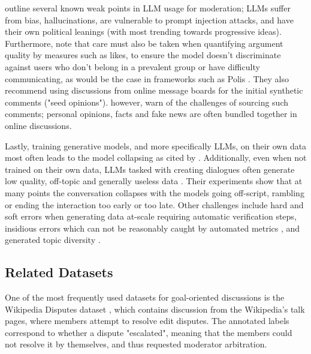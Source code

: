 \citet{small-polis-llm} outline several known weak points in LLM usage for moderation; LLMs suffer from bias, hallucinations, are vulnerable to prompt injection attacks, and have their own political leanings (with most trending towards progressive ideas). Furthermore, \citet{vecchi-2021-towards} note that care must also be taken when quantifying argument quality by measures such as likes, to ensure the model doesn't discriminate against users who don't belong in a prevalent group or have difficulty communicating, as would be the case in frameworks such as Polis \cite{small2021polis}. They also recommend using discussions from online message boards for the initial synthetic comments ("seed opinions"). \citet{vecchi-2021-towards} however, warn of the challenges of sourcing such comments; personal opinions, facts and fake news are often bundled together in online discussions.

Lastly, training generative models, and more specifically LLMs, on their own data most often leads to the model collapsing \cite{alemohammad2023selfconsuminggenerativemodelsmad, shumailov2024curserecursiontraininggenerated} as cited by \citet{ulmer2024bootstrappingllmbasedtaskorienteddialogue}. Additionally, even when not trained on their own data, LLMs tasked with creating dialogues often generate low quality, off-topic and generally useless data \cite{ulmer2024bootstrappingllmbasedtaskorienteddialogue}. Their experiments show that at many points the conversation collapses with the models going off-script, rambling or ending the interaction too early or too late. Other challenges include hard and soft errors when generating data at-scale \cite{lambert2024selfdirectedsyntheticdialoguesrevisions, ulmer2024bootstrappingllmbasedtaskorienteddialogue} requiring automatic verification steps, insidious errors which can not be reasonably caught by automated metrics \cite{lambert2024selfdirectedsyntheticdialoguesrevisions, ulmer2024bootstrappingllmbasedtaskorienteddialogue}, and generated topic diversity \cite{lambert2024selfdirectedsyntheticdialoguesrevisions}.


\subsection{Related Datasets}
\label{sec:related:datasets}


One of the most frequently used datasets for goal-oriented discussions is the Wikipedia Disputes dataset \cite{de-kock-vlachos-2021-beg}, which contains discussion from the Wikipedia's talk pages, where members attempt to resolve edit disputes. The annotated labels correspond to whether a dispute "escalated", meaning that the members could not resolve it by themselves, and thus requested moderator arbitration.

